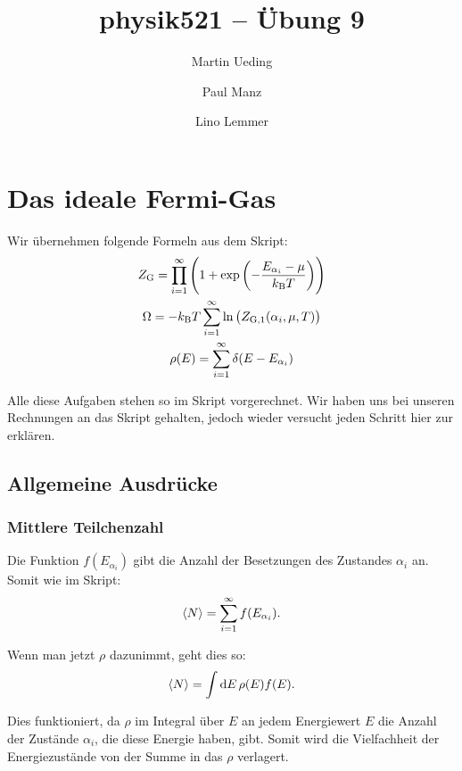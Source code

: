 

\hypersetup{
	pdftitle=
}

\title{physik521 -- Übung 9}
\author{
	Martin Ueding 
        \and
        Paul Manz
        \and
        Lino Lemmer
}



\maketitle

\section{Das ideale Fermi-Gas}

\newcommand\kB{k_\text B}
\newcommand\ZG{Z_\text G}
\newcommand\ZGe{Z_{\text G, 1}}
\newcommand\Eai{E_{\alpha_i}}
\newcommand\isum{\sum_{i=1}^\infty }

Wir übernehmen folgende Formeln aus dem Skript:
\begin{gather*}
    \ZG = \prod_{i=1}^\infty \del{1 + \exp\del{- \frac{\Eai - \mu}{\kB T}}} \\
    \Omega = - \kB T \isum \ln \del{\ZGe(\alpha_i, \mu, T)} \\
    \rho(E) = \isum \delta(E - \Eai)
\end{gather*}

Alle diese Aufgaben stehen so im Skript vorgerechnet. Wir haben uns bei
unseren Rechnungen an das Skript gehalten, jedoch wieder versucht jeden
Schritt hier zur erklären.

\subsection{Allgemeine Ausdrücke}

\subsubsection{Mittlere Teilchenzahl}

Die Funktion $f(\Eai)$ gibt die Anzahl der Besetzungen des Zustandes $\alpha_i$ an. Somit wie im Skript:
\[
    \bracket N = \isum f(\Eai).
\]

Wenn man jetzt $\rho$ dazunimmt, geht dies so:
\[
    \bracket N = \int \dif E \, \rho(E) f(E).
\]

Dies funktioniert, da $\rho$ im Integral über $E$ an jedem Energiewert $E$ die
Anzahl der Zustände $\alpha_i$, die diese Energie haben, gibt. Somit wird die
Vielfachheit der Energiezustände von der Summe in das $\rho$ verlagert.

